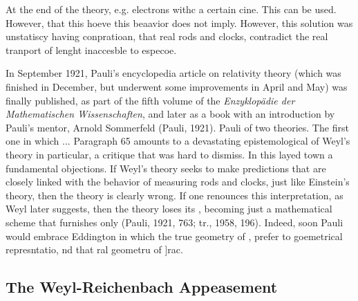 \documentclass[draft]{article}
\begin{document}
At the end of the theory, e.g. electrons withc a certain cine. This can be used. However, that this hoeve this beaavior does not imply. However, this solution was unstatiscy having conpratioan, that real rods and clocks, contradict the real tranport of lenght inaccesble to especoe.

In September 1921, Pauli's encyclopedia article on relativity theory (which was finished in December, but underwent some improvements in April and May) was finally published, as part of the fifth volume of the \textit{Enzyklopädie der Mathematischen Wissenschaften}, and later as a book with an introduction by Pauli's mentor, Arnold Sommerfeld (Pauli, 1921). Pauli of two theories. The first one in which  ... Paragraph 65 amounts to a devastating epistemological  of Weyl's theory in particular, a critique that was hard to dismiss.  In this layed town a fundamental objections. If Weyl's theory seeks to make predictions that are closely linked with the behavior of measuring rods and clocks, just like Einstein's theory, then the theory is clearly wrong. If one renounces this interpretation, as Weyl later suggests, then the theory loses its , becoming just a mathematical scheme that furnishes only  (Pauli, 1921, 763; tr., 1958, 196).  Indeed, soon Pauli would embrace Eddington in which the true geometry of \spti, prefer to goemetrical represntatio, nd that ral geometru of ]rac.

\subsection{The Weyl-Reichenbach Appeasement}


\end{document}
